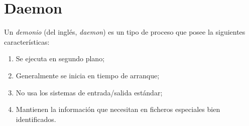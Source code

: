 %


\section{Daemon}


Un \emph{demonio} (del inglés, \emph{daemon}) es un tipo de proceso que posee la siguientes características:

\begin{enumerate}
	\item Se ejecuta en segundo plano; 
	\item Generalmente se inicia en tiempo de arranque;
	\item No usa los sistemas de entrada/salida est\'andar;
	\item Mantienen la información que necesitan en ficheros especiales bien identificados.
\end{enumerate}

%
%

